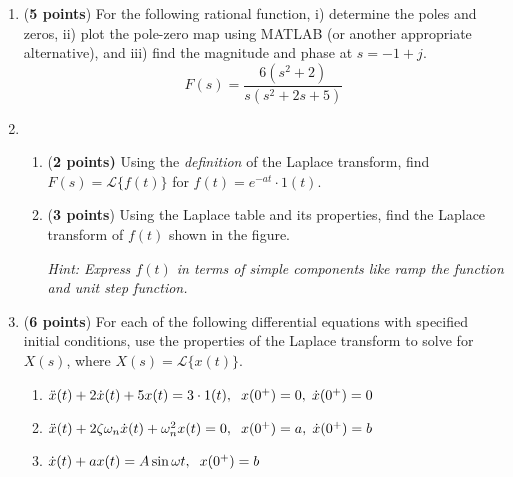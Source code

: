 \documentclass[]{book}
\begin{document}
\begin{enumerate}

\item (\textbf{5 points}) For the following rational function, i) determine the poles and zeros, ii) plot the pole-zero map using MATLAB (or another appropriate alternative), and iii) find the magnitude and phase at $s=-1+j$.
$$F(s)=\frac{6(s^2+2)}{s(s^2+2s+5)}$$
\vspace{0.2 cm}

\item
\begin{enumerate}
    \item (\textbf{2 points)} Using the \textit{definition} of the Laplace transform, find $F(s)=\mathcal{L}\{f(t)\}$ for $f(t)=e^{-at}\cdot1(t)$.
    \item (\textbf{3 points}) Using the Laplace table and its properties, find the Laplace transform of $f(t)$ shown in the figure.
    \begin{center}
    \end{center}
    \textit{Hint: Express $f(t)$ in terms of simple components like ramp the function and unit step function.}
\end{enumerate}
\vspace{0.4 cm}

\item (\textbf{6 points}) For each of the following differential equations with specified initial conditions, use the properties of the Laplace transform to solve for $X(s)$, where $X(s)=\mathcal{L}\{x(t)\}$.
\begin{enumerate}
    \item $\Ddot{x}(t)+2\Dot{x}(t)+5x(t)=3\cdot1(t),\hspace{0.2cm} x(0^+)=0,\hspace{0.1cm} \Dot{x}(0^+)=0$
    \item $\Ddot{x}(t)+2\zeta\omega_n\Dot{x}(t)+\omega_n^2x(t)=0,\hspace{0.2cm} x(0^+)=a,\hspace{0.1cm} \Dot{x}(0^+)=b$
    \item $\Dot{x}(t)+ax(t)=A\sin{\omega t},\hspace{0.2cm} x(0^+)=b$
\end{enumerate}
\vspace{0.4 cm}


\end{enumerate}
\end{document}
